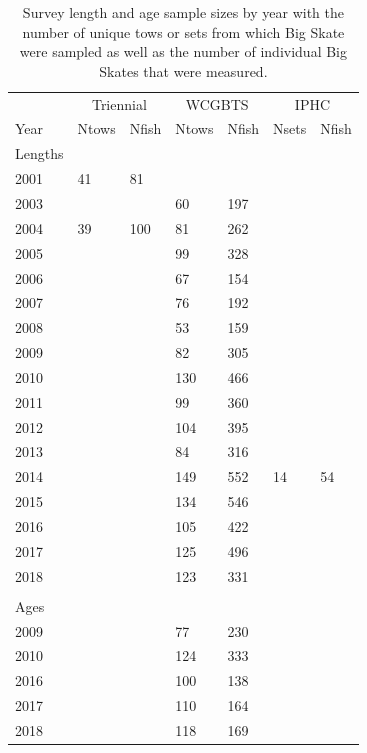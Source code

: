\documentclass[12pt,]{article}
\begin{document}
\begin{table}[ht]
\centering
\caption{Survey length and age sample sizes by year with the number of unique tows or sets from which Big Skate were sampled as well as the number of individual Big Skates that were measured.} 
\label{tab:Survey_Samples}
\begin{tabular}{lllllll}
  \hline
   \multicolumn{1}{c}{} & \multicolumn{2}{c}{Triennial} & \multicolumn{2}{c}{WCGBTS} & \multicolumn{2}{c}{IPHC} \\  \cmidrule(lr){2-3} \cmidrule(lr){4-5} \cmidrule(lr){6-7}
  Year & Ntows & Nfish & Ntows & Nfish & Nsets & Nfish \\ 
  \hline
Lengths &  &  &  &  &  &  \\ 
  2001 & 41 & 81 &  &  &  &  \\ 
  2003 &  &  & 60 & 197 &  &  \\ 
  2004 & 39 & 100 & 81 & 262 &  &  \\ 
  2005 &  &  & 99 & 328 &  &  \\ 
  2006 &  &  & 67 & 154 &  &  \\ 
  2007 &  &  & 76 & 192 &  &  \\ 
  2008 &  &  & 53 & 159 &  &  \\ 
  2009 &  &  & 82 & 305 &  &  \\ 
  2010 &  &  & 130 & 466 &  &  \\ 
  2011 &  &  & 99 & 360 &  &  \\ 
  2012 &  &  & 104 & 395 &  &  \\ 
  2013 &  &  & 84 & 316 &  &  \\ 
  2014 &  &  & 149 & 552 & 14 & 54 \\ 
  2015 &  &  & 134 & 546 &  &  \\ 
  2016 &  &  & 105 & 422 &  &  \\ 
  2017 &  &  & 125 & 496 &  &  \\ 
  2018 &  &  & 123 & 331 &  &  \\ 
   &  &  &  &  &  &  \\ 
  Ages &  &  &  &  &  &  \\ 
  2009 &  &  & 77 & 230 &  &  \\ 
  2010 &  &  & 124 & 333 &  &  \\ 
  2016 &  &  & 100 & 138 &  &  \\ 
  2017 &  &  & 110 & 164 &  &  \\ 
  2018 &  &  & 118 & 169 &  &  \\ 
   \hline
  \end{tabular}
\end{table}
\end{document}
